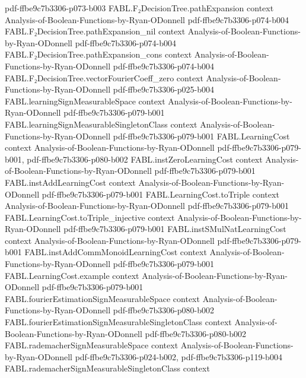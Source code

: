 \begin{theorem}
  {pdf-ffbe9c7b3306-p073-b003}
\proofstep
  {FABL.F₂DecisionTree.pathExpansion}
  {context}
  {Analysis-of-Boolean-Functions-by-Ryan-ODonnell}
  {pdf-ffbe9c7b3306-p074-b004}
\proofstep
  {FABL.F₂DecisionTree.pathExpansion_nil}
  {context}
  {Analysis-of-Boolean-Functions-by-Ryan-ODonnell}
  {pdf-ffbe9c7b3306-p074-b004}
\proofstep
  {FABL.F₂DecisionTree.pathExpansion_cons}
  {context}
  {Analysis-of-Boolean-Functions-by-Ryan-ODonnell}
  {pdf-ffbe9c7b3306-p074-b004}
\proofstep
  {FABL.F₂DecisionTree.vectorFourierCoeff_zero}
  {context}
  {Analysis-of-Boolean-Functions-by-Ryan-ODonnell}
  {pdf-ffbe9c7b3306-p025-b004}
\proofstep
  {FABL.learningSignMeasurableSpace}
  {context}
  {Analysis-of-Boolean-Functions-by-Ryan-ODonnell}
  {pdf-ffbe9c7b3306-p079-b001}
\proofstep
  {FABL.learningSignMeasurableSingletonClass}
  {context}
  {Analysis-of-Boolean-Functions-by-Ryan-ODonnell}
  {pdf-ffbe9c7b3306-p079-b001}
\proofstep
  {FABL.LearningCost}
  {context}
  {Analysis-of-Boolean-Functions-by-Ryan-ODonnell}
  {pdf-ffbe9c7b3306-p079-b001,
    pdf-ffbe9c7b3306-p080-b002}
\proofstep
  {FABL.instZeroLearningCost}
  {context}
  {Analysis-of-Boolean-Functions-by-Ryan-ODonnell}
  {pdf-ffbe9c7b3306-p079-b001}
\proofstep
  {FABL.instAddLearningCost}
  {context}
  {Analysis-of-Boolean-Functions-by-Ryan-ODonnell}
  {pdf-ffbe9c7b3306-p079-b001}
\proofstep
  {FABL.LearningCost.toTriple}
  {context}
  {Analysis-of-Boolean-Functions-by-Ryan-ODonnell}
  {pdf-ffbe9c7b3306-p079-b001}
\proofstep
  {FABL.LearningCost.toTriple_injective}
  {context}
  {Analysis-of-Boolean-Functions-by-Ryan-ODonnell}
  {pdf-ffbe9c7b3306-p079-b001}
\proofstep
  {FABL.instSMulNatLearningCost}
  {context}
  {Analysis-of-Boolean-Functions-by-Ryan-ODonnell}
  {pdf-ffbe9c7b3306-p079-b001}
\proofstep
  {FABL.instAddCommMonoidLearningCost}
  {context}
  {Analysis-of-Boolean-Functions-by-Ryan-ODonnell}
  {pdf-ffbe9c7b3306-p079-b001}
\proofstep
  {FABL.LearningCost.example}
  {context}
  {Analysis-of-Boolean-Functions-by-Ryan-ODonnell}
  {pdf-ffbe9c7b3306-p079-b001}
\proofstep
  {FABL.fourierEstimationSignMeasurableSpace}
  {context}
  {Analysis-of-Boolean-Functions-by-Ryan-ODonnell}
  {pdf-ffbe9c7b3306-p080-b002}
\proofstep
  {FABL.fourierEstimationSignMeasurableSingletonClass}
  {context}
  {Analysis-of-Boolean-Functions-by-Ryan-ODonnell}
  {pdf-ffbe9c7b3306-p080-b002}
\proofstep
  {FABL.rademacherSignMeasurableSpace}
  {context}
  {Analysis-of-Boolean-Functions-by-Ryan-ODonnell}
  {pdf-ffbe9c7b3306-p024-b002,
    pdf-ffbe9c7b3306-p119-b004}
\proofstep
  {FABL.rademacherSignMeasurableSingletonClass}
  {context}

\end{theorem}
